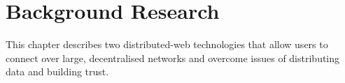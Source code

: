 \chapter{Background Research}

This chapter describes two distributed-web technologies that allow users to connect over large, decentralised networks and overcome issues of distributing data and building trust.


